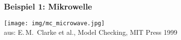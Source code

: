     \begin{frame}
      \label{fra:bsp_mikrowelle}
      \frametitle{Beispiel 1: Mikrowelle}

      \begin{center}
        \begin{minipage}{.7\textwidth}
          \texttt{[image: img/mc\_microwave.jpg]}\\
          {\footnotesize aus: E.\,M.\ Clarke et al., Model Checking, MIT Press 1999}
        \end{minipage}
      \end{center}

    \end{frame}

